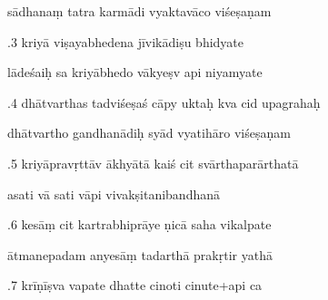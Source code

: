 \documentclass[article,12pt,a4paper]{memoir}%
\newcounter{parCount}
\begin{document}
	  
	  \pstart \leavevmode%
	sādhanaṃ tatra karmādi vyaktavāco viśeṣaṇam 
	{}
	\pend%
      

	  
	  \pstart {}.3 kriyā viṣayabhedena jīvikādiṣu bhidyate 
	{}
	\pend%
      

	  
	  \pstart \leavevmode%
	lādeśaiḥ sa kriyābhedo vākyeṣv api niyamyate 
	{}
	\pend%
      

	  
	  \pstart {}.4 dhātvarthas tadviśeṣaś cāpy uktaḥ kva cid upagrahaḥ 
	{}
	\pend%
      

	  
	  \pstart \leavevmode%
	dhātvartho gandhanādiḥ syād vyatihāro viśeṣaṇam 
	{}
	\pend%
      

	  
	  \pstart {}.5 kriyāpravṛttāv ākhyātā kaiś cit svārthaparārthatā 
	{}
	\pend%
      

	  
	  \pstart \leavevmode%
	asati vā sati vāpi vivakṣitanibandhanā 
	{}
	\pend%
      

	  
	  \pstart {}.6 kesāṃ cit kartrabhiprāye ṇicā saha vikalpate 
	{}
	\pend%
      

	  
	  \pstart \leavevmode%
	ātmanepadam anyesāṃ tadarthā prakṛtir yathā 
	{}
	\pend%
      

	  
	  \pstart {}.7 krīṇīṣva vapate dhatte cinoti cinute+api ca 
	{}
	\pend%
      
\end{document}
